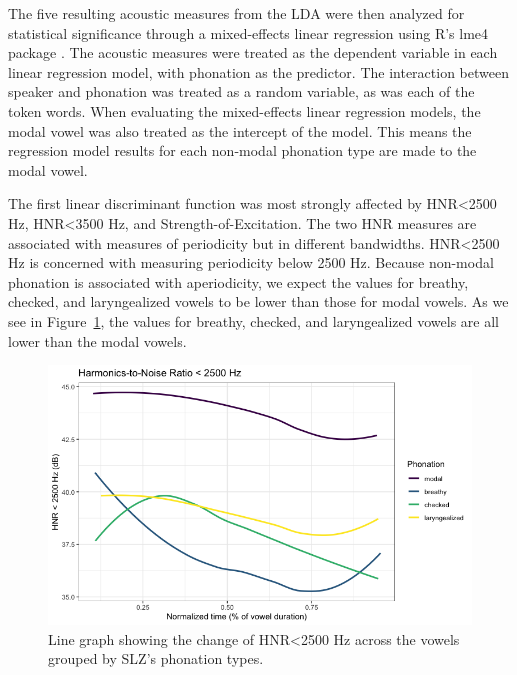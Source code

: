 \documentclass[12pt, letterpaper]{article}
\begin{document}
The five resulting acoustic measures from the LDA were then analyzed for statistical significance through a mixed-effects linear regression using R's lme4 package \citep{batesFittingLinearMixedEffects2015}. The acoustic measures were treated as the dependent variable in each linear regression model, with phonation as the predictor. The interaction between speaker and phonation was treated as a random variable, as was each of the token words. When evaluating the mixed-effects linear regression models, the modal vowel was also treated as the intercept of the model. This means the regression model results for each non-modal phonation type are made to the modal vowel.  

The first linear discriminant function was most strongly affected by HNR\textless 2500 Hz, HNR\textless 3500 Hz, and Strength-of-Excitation. The two HNR measures are associated with measures of periodicity but in different bandwidths. HNR\textless 2500 Hz is concerned with measuring periodicity below 2500 Hz. Because non-modal phonation is associated with aperiodicity, we expect the values for breathy, checked, and laryngealized vowels to be lower than those for modal vowels. As we see in Figure~\ref*{fig:HNR25}, the values for breathy, checked, and laryngealized vowels are all lower than the modal vowels. 
\begin{figure}[!h]
	\centering
	\includegraphics[width=.75\linewidth]{Images/HNR25.png}
	\caption{Line graph showing the change of HNR\textless 2500 Hz across the vowels grouped by SLZ's phonation types.}
	\label{fig:HNR25}
\end{figure}
\end{document}
